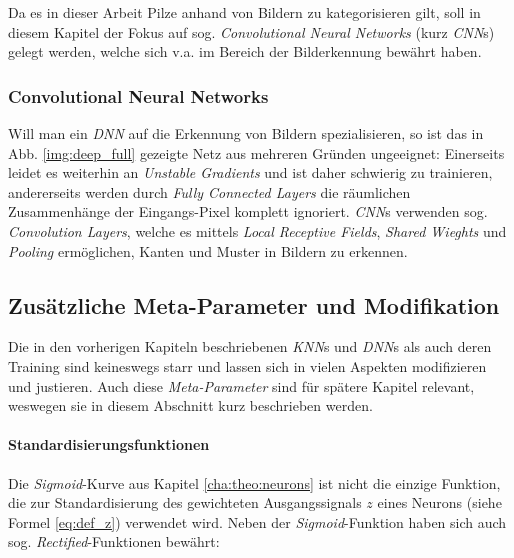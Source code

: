 Da es in dieser Arbeit Pilze anhand von Bildern zu kategorisieren gilt, soll in diesem Kapitel der Fokus auf sog. \textit{Convolutional Neural Networks} (kurz \textit{CNN}s) gelegt werden, welche sich v.a. im Bereich der Bilderkennung bewährt haben.

\subsubsection{Convolutional Neural Networks}
Will man ein \textit{DNN} auf die Erkennung von Bildern spezialisieren, so ist das in Abb. \ref{img:deep_full} gezeigte Netz aus mehreren Gründen ungeeignet: Einerseits leidet es weiterhin an \textit{Unstable Gradients} und ist daher schwierig zu trainieren, andererseits werden durch \textit{Fully Connected Layers} die räumlichen Zusammenhänge der Eingangs-Pixel komplett ignoriert. \textit{CNN}s verwenden sog. \textit{Convolution Layers}, welche es mittels \textit{Local Receptive Fields}, \textit{Shared Wieghts} und \textit{Pooling} ermöglichen, Kanten und Muster in Bildern zu erkennen.



\subsection{Zusätzliche Meta-Parameter und Modifikation}
Die in den vorherigen Kapiteln beschriebenen \textit{KNN}s und \textit{DNN}s als auch deren Training sind keineswegs starr und lassen sich in vielen Aspekten modifizieren und justieren. Auch diese \textit{Meta-Parameter} sind für spätere Kapitel relevant, weswegen sie in diesem Abschnitt kurz beschrieben werden. 

\paragraph{Standardisierungsfunktionen}
Die \textit{Sigmoid}-Kurve aus Kapitel \ref{cha:theo:neurons} ist nicht die einzige Funktion, die zur Standardisierung des gewichteten Ausgangssignals $z$ eines Neurons (siehe Formel \ref{eq:def_z}) verwendet wird. Neben der \textit{Sigmoid}-Funktion haben sich auch sog. \textit{Rectified}-Funktionen bewährt:

%

